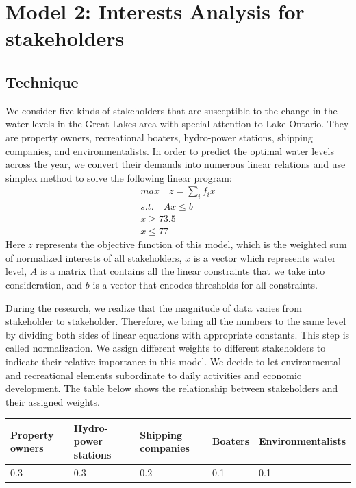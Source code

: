 \documentclass[pre,12pt]{revtex4-1}
\begin{document}
\newpage

\section{Model 2: Interests Analysis for stakeholders}\label{Model}
\subsection{Technique}
We consider five kinds of stakeholders that are susceptible to the change in the water levels in the Great Lakes area with special attention to Lake Ontario. They are property owners, recreational boaters, hydro-power stations, shipping companies, and environmentalists. In order to predict the optimal water levels across the year, we convert their demands into numerous linear relations and use simplex method to solve the following linear program: \\ 
\begin{align}
    max\quad z = \sum_{i}{f_{i}x} \\
    s.t. \quad Ax \leq b \\
    x \geq 73.5 \\
    x \leq 77
\end{align}
Here $z$ represents the objective function of this model, which is the weighted sum of normalized interests of all stakeholders, $x$ is a vector which represents water level, $A$ is a matrix that contains all the linear constraints that we take into consideration, and $b$ is a vector that encodes thresholds for all constraints. \par
During the research, we realize that the magnitude of data varies from stakeholder to stakeholder. Therefore, we bring all the numbers to the same level by dividing both sides of linear equations with appropriate constants. This step is called normalization. We assign different weights to different stakeholders to indicate their relative importance in this model. We decide to let environmental and recreational elements subordinate to daily activities and economic development. The table below shows the relationship between stakeholders and their assigned weights. \\
\begin{center}
\begin{tabular}{lllll}
\hline
\multicolumn{1}{l|}{Property owners}   & \multicolumn{1}{l|}{Hydro-power stations}  & \multicolumn{1}{l|}{Shipping companies}   & \multicolumn{1}{l|}{Boaters} & \multicolumn{1}{l}{Environmentalists}  \\ \hline
\multicolumn{1}{l|}{0.3} & \multicolumn{1}{l|}{0.3} & \multicolumn{1}{l|}{0.2} & \multicolumn{1}{l|}{0.1} & \multicolumn{1}{l}{0.1} \\ \hline
\end{tabular}
\end{center}
\end{document}
